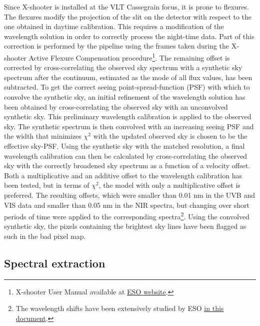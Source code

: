 \documentclass{aa}    %
\begin{document}
Since X-shooter is installed at the VLT Cassegrain focus, it is prone to
flexures. The flexures modify the projection of the slit on the detector with
respect to the one obtained in daytime calibration. This requires a modification
of the wavelength solution in order to correctly process the night-time data.
Part of this correction is performed by the pipeline using the frames taken
during the X-shooter Active Flexure Compensation procedure\footnote{X-shooter
	User Manual available at \href{https://www.eso.org/sci/facilities/paranal/instruments/xshooter/doc.html}{ESO website}.}. The
remaining offset is corrected by cross-correlating the observed sky spectrum
with a synthetic sky spectrum \citep{Noll2012, Jones2013} after the continuum,
estimated as the mode of all flux values, has been subtracted. To get the
correct seeing point-spread-function (PSF) with which to convolve the synthetic sky, an initial
refinement of the wavelength solution has been obtained by cross-correlating the
observed sky with an unconvolved synthetic sky. This preliminary wavelength
calibration is applied to the observed sky. The synthetic spectrum is then
convolved with an increasing seeing PSF and the width that minimizes $\chi^2$
with the updated observed sky is chosen to be the effective sky-PSF. Using the
synthetic sky with the matched resolution, a final wavelength calibration can
then be calculated by cross-correlating the observed sky with the correctly
broadened sky spectrum as a function of a velocity offset. Both a
multiplicative and an additive offset to the wavelength calibration has been
tested, but in terms of $\chi^2$, the model with only a multiplicative offset is
preferred. The resulting offsets, which were smaller than 0.01 nm in the UVB and
VIS data and smaller than 0.05 nm in the NIR spectra, but changing over short
periods of time were applied to the corresponding spectra\footnote{The
	wavelength shifts have been extensively studied by ESO
	\href{https://www.eso.org/sci/facilities/paranal/instruments/xshooter/doc/XS_wlc_shift_150615.pdf}{in this document}.}. Using the convolved synthetic sky, the pixels containing the brightest sky lines have been flagged as such in the bad pixel map.

\subsection{Spectral extraction}    \label{extract}
\end{document}
